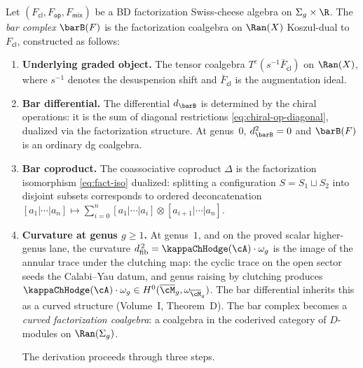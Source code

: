\begin{construction}
\label{constr:bar-fact-coalgebra}
Let $(F_{\mathsf{cl}}, F_{\mathsf{op}}, F_{\mathsf{mix}})$ be a
BD factorization Swiss-cheese algebra on $\Sigma_g \times \R$.
The \emph{bar complex} $\barB(F)$ is the factorization coalgebra on
$\Ran(X)$ Koszul-dual to $F_{\mathsf{cl}}$, constructed as follows:
\begin{enumerate}[label=\textup{(\roman*)}]
\item \textbf{Underlying graded object.} The tensor coalgebra
 $T^c(s^{-1}\bar{F}_{\mathsf{cl}})$ on $\Ran(X)$, where
 $s^{-1}$ denotes the desuspension shift and
 $\bar{F}_{\mathsf{cl}}$ is the augmentation ideal.

\item \textbf{Bar differential.} The differential
 $d_{\barB}$ is determined by the chiral operations:
 it is the sum of diagonal restrictions
 \eqref{eq:chiral-op-diagonal}, dualized via the
 factorization structure. At genus~$0$,
 $d_{\barB}^2 = 0$ and $\barB(F)$ is an ordinary dg coalgebra.

\item \textbf{Bar coproduct.} The coassociative coproduct
 $\Delta$ is the factorization isomorphism
 \eqref{eq:fact-iso} dualized: splitting a configuration
 $S = S_1 \sqcup S_2$ into disjoint subsets corresponds to
 ordered deconcatenation $[a_1|\cdots|a_n] \mapsto
 \sum_{i=0}^n [a_1|\cdots|a_i] \otimes
 [a_{i+1}|\cdots|a_n]$.

\item \textbf{Curvature at genus $g \geq 1$.} At genus~$1$, and on
 the proved scalar higher-genus lane, the curvature
 $\dfib^{\,2} = \kappaChHodge(\cA) \cdot \omega_g$ is
 the image of the annular trace under the clutching map:
 the cyclic trace on the open sector seeds the Calabi--Yau
 datum, and genus raising by clutching produces
 $\kappaChHodge(\cA) \cdot \omega_g \in H^0(\Mbar_g, \omega_{\Mbar_g})$.
 The bar differential inherits this as a curved structure
 (Volume~I, Theorem~D). The bar complex becomes a
 \emph{curved factorization coalgebra}: a coalgebra in the
 coderived category of $D$-modules on $\Ran(\Sigma_g)$.

 The derivation proceeds through three steps.


\end{enumerate}
\end{construction}
